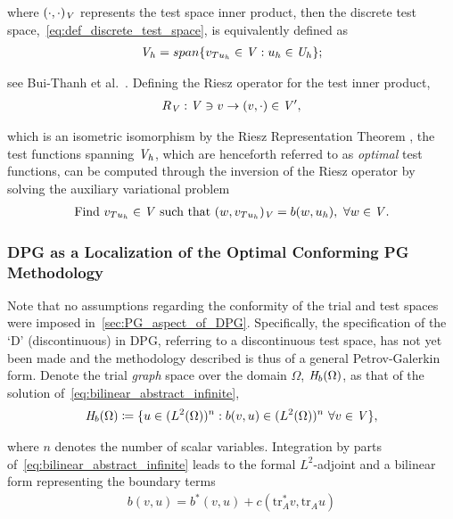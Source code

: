where $(\cdot,\cdot)_{\mathit{{{V}}}}$ represents the test space inner product, then the discrete test
space,~\eqref{eq:def_discrete_test_space}, is equivalently defined as
\begin{align} \label{eq:def_discrete_test_space_alt}
\mathit{{{V}}}_h = span \{ v_{T u_h} \in \mathit{{{V}}} : u_h \in \mathit{{{U}}}_h \};
\end{align}

see Bui-Thanh et al.~\cite[Theorem ]{BuiThanh2013}. Defining the Riesz operator for the test inner
product,
\begin{align}
R_{\mathit{{{V}}}} : \mathit{{{V}}} \ni v \rightarrow (v,\cdot) \in \mathit{{{V}}}',
\end{align}

which is an isometric isomorphism by the Riesz Representation Theorem , the test functions
spanning $\mathit{{{V}}}_h$, which are henceforth referred to as \emph{optimal} test
functions, can be computed through the inversion of the Riesz operator by solving the auxiliary variational problem
\begin{align} \label{eq:auxiliary_opt_v}
\text{Find}\ v_{T u_h} \in \mathit{{{V}}}\ \text{such that}\
(w,v_{T u_h})_{\mathit{{{V}}}} = b(w,u_h),\ \forall w \in \mathit{{{V}}}.
\end{align}

\subsubsection{DPG as a Localization of the Optimal Conforming PG Methodology}

Note that no assumptions regarding the conformity of the trial and test spaces were imposed
in~\autoref{sec:PG_aspect_of_DPG}. Specifically, the specification of the `D' (discontinuous) in DPG, referring to a
discontinuous test space, has not yet been made and the methodology described is thus of a general Petrov-Galerkin
form. Denote the trial \emph{graph} space over the domain $\Omega$, $\mathit{{{H}}}_b(\Omega)$, as that of the solution
of~\eqref{eq:bilinear_abstract_infinite},
\begin{align}
\mathit{{{H}}}_b(\Omega) \coloneqq
\{ u \in (L^2(\Omega))^n : b(v,u) \in (L^2(\Omega))^n\ \forall v \in \mathit{{{V}}} \},
\end{align}

where $n$ denotes the number of scalar variables. Integration by parts of~\eqref{eq:bilinear_abstract_infinite} leads to
the formal $L^2$-adjoint and a bilinear form representing the boundary terms
\begin{align}
b(v,u) = b^*(v,u) + c(\text{tr}_A^* v, \text{tr}_A u)
\end{align}

